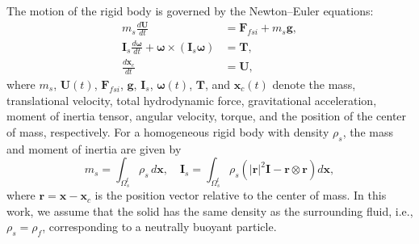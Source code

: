 \documentclass{article}
\newcommand{\bU}{{\mathbf{U}}}
\newcommand{\bx}{{\mathbf{x}}}
\newcommand{\bu}{{\mathbf{u}}}
\begin{document}



The motion of the rigid body is governed by the Newton--Euler equations:
\begin{equation}\label{eq:solid}
    \begin{aligned}
        m_s \frac{d\mathbf{U}}{dt} &= \mathbf{F}_{fsi} + m_s \mathbf{g}, \\
        \mathbf{I}_s \frac{d\boldsymbol{\omega}}{dt} + \boldsymbol{\omega} \times (\mathbf{I}_s \boldsymbol{\omega}) &= \mathbf{T}, \\
        \frac{d\mathbf{x}_c}{dt} &= \mathbf{U},
    \end{aligned}
\end{equation}
where $m_s$, $\mathbf{U}(t)$, $\mathbf{F}_{fsi}$, $\mathbf{g}$, $\mathbf{I}_s$, $\boldsymbol{\omega}(t)$, $\mathbf{T}$, and $\mathbf{x}_c(t)$ denote the mass, translational velocity, total hydrodynamic force, gravitational acceleration, moment of inertia tensor, angular velocity, torque, and the position of the center of mass, respectively. 
For a homogeneous rigid body with density $\rho_s$, the mass and moment of inertia are given by
\begin{equation}
    m_s = \int_{\Omega_s^t} \rho_s \, d\mathbf{x}, \quad
    \mathbf{I}_s = \int_{\Omega_s^t} \rho_s \left( |\mathbf{r}|^2 \mathbf{I} - \mathbf{r} \otimes \mathbf{r} \right) d\mathbf{x},
\end{equation}
where $\mathbf{r} = \mathbf{x} - \mathbf{x}_c$ is the position vector relative to the center of mass. 
In this work, we assume that the solid has the same density as the surrounding fluid, i.e., $\rho_s = \rho_f$, corresponding to a neutrally buoyant particle.
\end{document}

